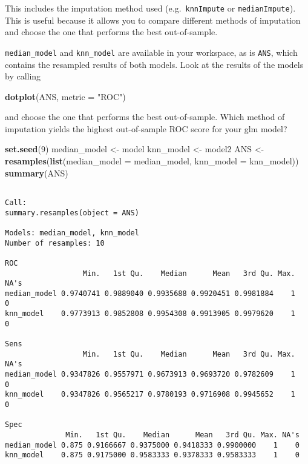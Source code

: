 \documentclass[
]{book}
\newenvironment{Shaded}{\begin{snugshade}}{\end{snugshade}}
\newcommand{\DataTypeTok}[1]{\textcolor[rgb]{0.13,0.29,0.53}{#1}}
\newcommand{\DecValTok}[1]{\textcolor[rgb]{0.00,0.00,0.81}{#1}}
\newcommand{\KeywordTok}[1]{\textcolor[rgb]{0.13,0.29,0.53}{\textbf{#1}}}
\newcommand{\NormalTok}[1]{#1}
\newcommand{\StringTok}[1]{\textcolor[rgb]{0.31,0.60,0.02}{#1}}
\begin{document}
This includes the imputation method used (e.g.~\texttt{knnImpute} or \texttt{medianImpute}). This is useful because it allows you to compare different methods of imputation and choose the one that performs the best out-of-sample.

\texttt{median\_model} and \texttt{knn\_model} are available in your workspace, as is \texttt{ANS}, which contains the resampled results of both models. Look at the results of the models by calling

\begin{Shaded}
\begin{Highlighting}[]
\KeywordTok{dotplot}\NormalTok{(ANS, }\DataTypeTok{metric =} \StringTok{"ROC"}\NormalTok{)}
\end{Highlighting}
\end{Shaded}

and choose the one that performs the best out-of-sample. Which method of imputation yields the highest out-of-sample ROC score for your glm model?

\begin{Shaded}
\begin{Highlighting}[]
\KeywordTok{set.seed}\NormalTok{(}\DecValTok{9}\NormalTok{)}
\NormalTok{median_model <-}\StringTok{ }\NormalTok{model}
\NormalTok{knn_model <-}\StringTok{ }\NormalTok{model2}
\NormalTok{ANS <-}\StringTok{ }\KeywordTok{resamples}\NormalTok{(}\KeywordTok{list}\NormalTok{(}\DataTypeTok{median_model =}\NormalTok{ median_model, }\DataTypeTok{knn_model =}\NormalTok{ knn_model))}
\KeywordTok{summary}\NormalTok{(ANS)}
\end{Highlighting}
\end{Shaded}

\begin{verbatim}

Call:
summary.resamples(object = ANS)

Models: median_model, knn_model 
Number of resamples: 10 

ROC 
                  Min.   1st Qu.    Median      Mean   3rd Qu. Max. NA's
median_model 0.9740741 0.9889040 0.9935688 0.9920451 0.9981884    1    0
knn_model    0.9773913 0.9852808 0.9954308 0.9913905 0.9979620    1    0

Sens 
                  Min.   1st Qu.    Median      Mean   3rd Qu. Max. NA's
median_model 0.9347826 0.9557971 0.9673913 0.9693720 0.9782609    1    0
knn_model    0.9347826 0.9565217 0.9780193 0.9716908 0.9945652    1    0

Spec 
              Min.   1st Qu.    Median      Mean   3rd Qu. Max. NA's
median_model 0.875 0.9166667 0.9375000 0.9418333 0.9900000    1    0
knn_model    0.875 0.9175000 0.9583333 0.9378333 0.9583333    1    0
\end{verbatim}
\end{document}
